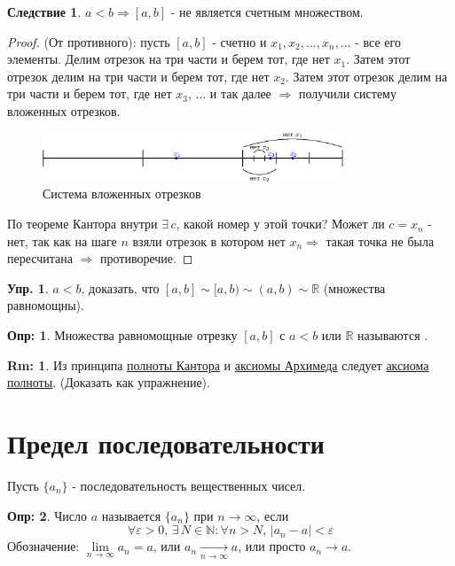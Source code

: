 \documentclass[12pt]{article}
\theoremstyle{definition}
\newtheorem{defn}{Опр:}
\newtheorem{rem}{Rm:}
\newtheorem{exrc}{Упр.}
\newtheorem{corollary}{Следствие}
\begin{document}
\begin{corollary}
	$a < b \Rightarrow [a,b]$ - не является счетным множеством.
\end{corollary}

\begin{proof}
	(От противного): пусть $[a,b]$ - счетно и $x_1, x_2, \dotsc, x_n, \dotsc $ - все его элементы. Делим отрезок на три части и берем тот, где нет $x_1$. Затем этот отрезок делим на три части и берем тот, где нет $x_2$. Затем этот отрезок делим на три части и берем тот, где нет $x_3$, $\dotsc$ и так далее $\Rightarrow$ получили систему вложенных отрезков.
	
 	\begin{figure}[H]
		\centering
		\includegraphics[width=0.8\textwidth]{7_4.eps}
	 	\caption{Система вложенных отрезков}
		\label{fig:7_4}
	\end{figure}
	
	По теореме Кантора внутри $\exists \, c$, какой номер у этой точки? Может ли $c = x_n$ - нет, так как на шаге $n$ взяли отрезок в котором нет $x_n \Rightarrow$ такая точка не была пересчитана $\Rightarrow$ противоречие.
\end{proof}
\begin{exrc}
	$a < b$, доказать, что $[a,b] \sim [a,b) \sim (a,b) \sim \mathbb{R}$ (множества равномощны).
\end{exrc}

\begin{defn}
	Множества равномощные отрезку $[a,b]$ с $a < b$ или $\mathbb{R}$ называются .
\end{defn}

\begin{rem}
	Из принципа \uline{полноты Кантора} и \uline{аксиомы Архимеда} следует \uline{аксиома полноты}. (Доказать как упражнение).
\end{rem}

\section*{Предел последовательности}

Пусть $\{a_n\}$ - последовательность вещественных чисел.

\begin{defn}
	Число $a$ называется  $\{a_n\}$ при $n \rightarrow \infty$, если $$\forall \varepsilon > 0,\, \exists\, N \in \mathbb{N} \colon \forall n > N, \, |a_n - a| < \varepsilon$$
	Обозначение: $\lim\limits_{n \rightarrow \infty}{a_n} = a$, или $a_n \xrightarrow[n\to \infty]{} a$, или просто $a_n \to a$.
\end{defn}
\end{document}
